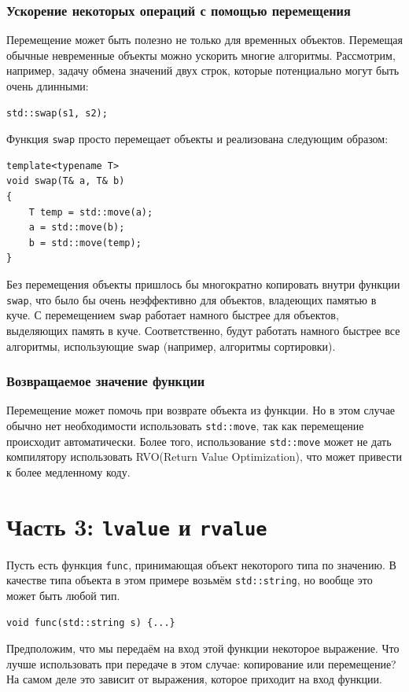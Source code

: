 \documentclass{article}
\begin{document}
\subsubsection*{Ускорение некоторых операций с помощью перемещения}
Перемещение может быть полезно не только для временных объектов. Перемещая обычные невременные объекты можно ускорить многие алгоритмы. Рассмотрим, например, задачу обмена значений двух строк, которые потенциально могут быть очень длинными:
\begin{lstlisting}
std::swap(s1, s2);
\end{lstlisting}
Функция \texttt{swap} просто перемещает объекты и реализована следующим образом:
\begin{lstlisting}
template<typename T> 
void swap(T& a, T& b) 
{
    T temp = std::move(a);
    a = std::move(b);
    b = std::move(temp);
}
\end{lstlisting}
Без перемещения объекты пришлось бы многократно копировать внутри функции \texttt{swap}, что было бы очень неэффективно для объектов, владеющих памятью в куче. С перемещением \texttt{swap} работает намного быстрее для объектов, выделяющих память в куче. Соответственно, будут работать намного быстрее все алгоритмы, использующие \texttt{swap} (например, алгоритмы сортировки).

\subsubsection*{Возвращаемое значение функции}
Перемещение может помочь при возврате объекта из функции. Но в этом случае обычно нет необходимости использовать \texttt{std::move}, так как перемещение происходит автоматически. Более того, использование \texttt{std::move} может не дать компилятору использовать RVO(Return Value Optimization), что может привести к более медленному коду.


\newpage
\section*{Часть 3: \texttt{lvalue} и \texttt{rvalue}}
Пусть есть функция \texttt{func}, принимающая объект некоторого типа по значению. В качестве типа объекта в этом примере возьмём \texttt{std::string}, но вообще это может быть любой тип. 
\begin{lstlisting}
void func(std::string s) {...}
\end{lstlisting}
Предположим, что мы передаём на вход этой функции некоторое выражение. Что лучше использовать при передаче в этом случае: копирование или перемещение? На самом деле это зависит от выражения, которое приходит на вход функции.
\end{document}
